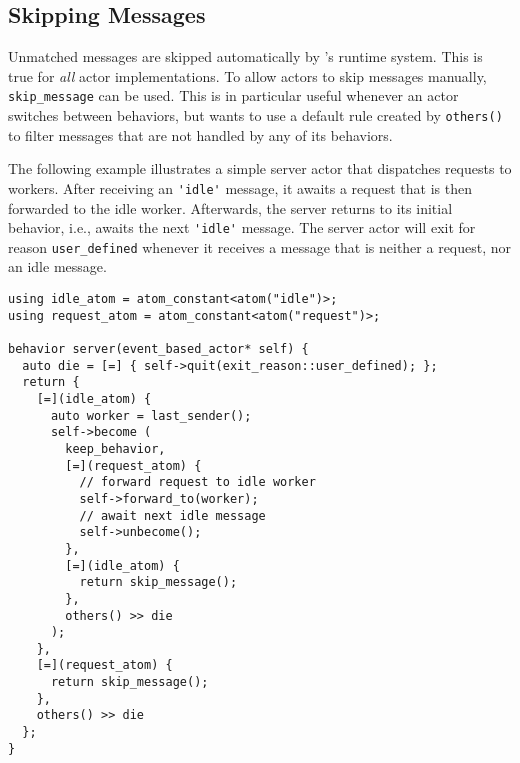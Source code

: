\clearpage
\subsection{Skipping Messages}

Unmatched messages are skipped automatically by \lib's runtime system.
This is true for \textit{all} actor implementations.
To allow actors to skip messages manually, \lstinline^skip_message^ can be used.
This is in particular useful whenever an actor switches between behaviors, but wants to use a default rule created by \lstinline^others()^ to filter messages that are not handled by any of its behaviors.

The following example illustrates a simple server actor that dispatches requests to workers.
After receiving an \lstinline^'idle'^ message, it awaits a request that is then forwarded to the idle worker.
Afterwards, the server returns to its initial behavior, i.e., awaits the next \lstinline^'idle'^ message.
The server actor will exit for reason \lstinline^user_defined^ whenever it receives a message that is neither a request, nor an idle message.

\begin{lstlisting}
using idle_atom = atom_constant<atom("idle")>;
using request_atom = atom_constant<atom("request")>;

behavior server(event_based_actor* self) {
  auto die = [=] { self->quit(exit_reason::user_defined); };
  return {
    [=](idle_atom) {
      auto worker = last_sender();
      self->become (
        keep_behavior,
        [=](request_atom) {
          // forward request to idle worker
          self->forward_to(worker);
          // await next idle message
          self->unbecome();
        },
        [=](idle_atom) {
          return skip_message();
        },
        others() >> die
      );
    },
    [=](request_atom) {
      return skip_message();
    },
    others() >> die
  };
}
\end{lstlisting}
